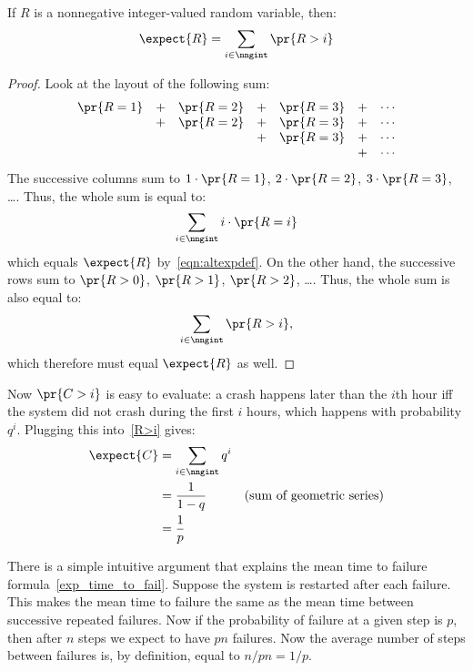 \begin{editingnotes}
\begin{lemma}
If $R$ is a nonnegative integer-valued random variable, then:
%
\begin{equation}\label{R>i}
\expect{R} = \sum_{i \in \nngint} \pr{R > i}
\end{equation}
\end{lemma}

\begin{proof}
Look at the layout of the following sum:
%
\[
\begin{array}{ccccccc}
\pr{R = 1} & + & \pr{R = 2} & + & \pr{R = 3} & + & \cdots \\
           & + & \pr{R = 2} & + & \pr{R = 3} & + & \cdots \\
           &   &            & + & \pr{R = 3} & + & \cdots \\
           &   &            &   &            & + & \cdots
\end{array}
\]
%
The successive columns sum to $1 \cdot \pr{R = 1}$, $2 \cdot \pr{R = 2}$,
$3 \cdot \pr{R = 3}$, \dots.  Thus, the whole sum is equal to:
%
\[
\sum_{i \in \nngint} i \cdot \pr{R = i}
\]
which equals $\expect{R}$ by~\eqref{eqn:altexpdef}.  On the other hand, the
successive rows sum to $\pr{R > 0}$, $\pr{R > 1}$, $\pr{R > 2}$, \dots.
Thus, the whole sum is also equal to:
%
\[
\sum_{i \in \nngint} \pr{R > i},
\]
%
which therefore must equal $\expect{R}$ as well.
\end{proof}

Now $\pr{C > i}$ is easy to evaluate: a crash happens later than the $i$th
hour iff the system did not crash during the first $i$ hours, which
happens with probability $q^i$.  Plugging this into~\eqref{R>i} gives:
%
\begin{align*}
\expect{C} & = \sum_{i \in \nngint} q^i \\
       & = \frac{1}{1 - q} & \text{(sum of geometric series)}\\
       & = \frac{1}{p}
\end{align*}
\end{editingnotes}

There is a simple intuitive argument that explains the mean time to
failure formula~\eqref{exp_time_to_fail}.  Suppose the system is
restarted after each failure.  This makes the mean time to failure the
same as the mean time between successive repeated failures.  Now if
the probability of failure at a given step is $p$, then after $n$
steps we expect to have $pn$ failures.  Now the average number of
steps between failures is, by definition, equal to $n/pn = 1/p$.

